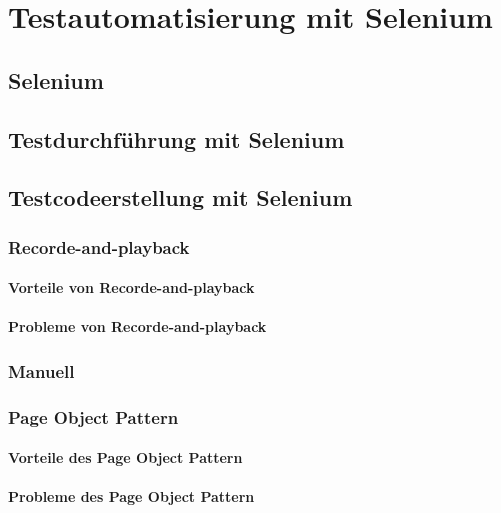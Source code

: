 \chapter{Testautomatisierung mit Selenium}
\label{sec:testautomatisierung_mit_selenium}


\section{Selenium}
\label{sec:selenium}

\section{Testdurchführung mit Selenium}
\label{sec:testdurchführung_mit_selenium}


\section{Testcodeerstellung mit Selenium}
\label{sec:Testdesign}


\subsection{Recorde-and-playback}
\label{sec:recorde_and_playback}


\subsubsection{Vorteile von Recorde-and-playback}
\label{sec:vorteile_von_recorde_and_playback}

\subsubsection{Probleme von Recorde-and-playback}
\label{sec:probleme_von_recorde_and_playback}

\subsection{Manuell}
\label{sec:manuell}

\subsection{Page Object Pattern}
\label{sec:page_object_pattern}

\subsubsection{Vorteile des Page Object Pattern}
\label{sec:vorteile_des_page_object_pattern}

\subsubsection{Probleme des Page Object Pattern}
\label{sec:probleme_des_page_object_pattern}



